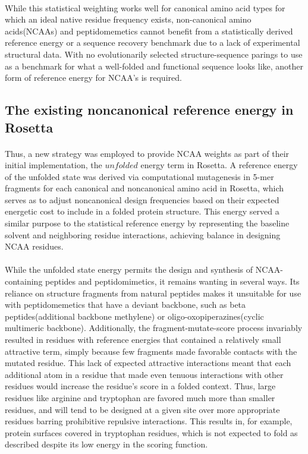 \paragraph{}
While this statistical weighting works well for canonical amino acid types for which an ideal native residue frequency exists, non-canonical amino acids(NCAAs) and peptidomemetics cannot benefit from a statistically derived reference energy or a sequence recovery benchmark due to a lack of experimental structural data. With no evolutionarily selected structure-sequence parings to use as a benchmark for what a well-folded and functional sequence looks like, another form of reference energy for NCAA's is required.

\subsection{The existing noncanonical reference energy in Rosetta}

\paragraph{}
Thus, a new strategy was employed to provide NCAA weights as part of their initial implementation, the $unfolded$ energy term in Rosetta\cite{renfrew_incorporation_2012}.
A reference energy of the unfolded state was derived via computational mutagenesis in 5-mer fragments for each canonical and noncanonical amino acid in Rosetta, which serves as to adjust noncanonical design frequencies based on their expected energetic cost to include in a folded protein structure.
This energy served a similar purpose to the statistical reference energy by representing the baseline solvent and neighboring residue interactions, achieving balance in designing NCAA residues.

\paragraph{}
While the unfolded state energy permits the design and synthesis of NCAA-containing peptides and peptidomimetics\cite{lao_rational_2014,drew_adding_2013}, it remains wanting in several ways.
Its reliance on structure fragments from natural peptides makes it unsuitable for use with peptidomemetics that have a deviant backbone, such as beta peptides(additional backbone methylene) or oligo-oxopiperazines(cyclic multimeric backbone).
Additionally, the fragment-mutate-score process invariably resulted in residues with reference energies that contained a relatively small attractive term, simply because few fragments made favorable contacts with the mutated residue.
This lack of expected attractive interactions meant that each additional atom in a residue that made even tenuous interactions with other residues would increase the residue's score in a folded context.
Thus, large residues like arginine and tryptophan are favored much more than smaller residues, and will tend to be designed at a given site over more appropriate residues barring prohibitive repulsive interactions.
This results in, for example, protein surfaces covered in tryptophan residues, which is not expected to fold as described despite its low energy in the scoring function.

